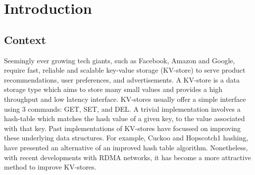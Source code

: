 

\chapter{Introduction}

\ifpdf
    \graphicspath{{1_introduction/figures/PNG/}{1_introduction/figures/PDF/}{1_introduction/figures/}}
\else
    \graphicspath{{1_introduction/figures/EPS/}{1_introduction/figures/}}
\fi







\section{Context}
Seemingly ever growing tech giants, such as Facebook, Amazon and Google, require fast, reliable and scalable key-value storage (KV-store) to serve product recommendations, user preferences, and advertisements.
A KV-store is a data storage type which aims to store many small values and provides a high throughput and low latency interface.
KV-stores usually offer a simple interface using 3 commands: GET, SET, and DEL. A trivial implementation involves a hash-table which matches the hash value of a given key, to the value associated with that key.
Past implementations of KV-stores have focussed on improving these underlying data structures.
For example, Cuckoo and Hopscotch1 \cite{geambasu2010comet} hashing, have presented an alternative of an improved hash table algorithm.
Nonetheless, with recent developments with RDMA networks, it has become a more attractive method to improve KV-stores.

